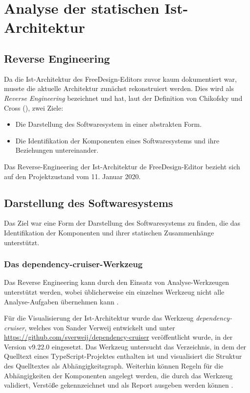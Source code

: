 

\section{Analyse der statischen Ist-Architektur}

\subsection{Reverse Engineering}
Da die Ist-Architektur des FreeDesign-Editors zuvor kaum dokumentiert war, musste die aktuelle Architektur zunächst rekonstruiert werden. 
Dies wird als \emph{Reverse Engineering} bezeichnet und hat, laut der Definition von Chikofsky und Cross (\citeyear[S. 13-17]{Chikofsky1990}), zwei Ziele: 
\begin{itemize}
    \item Die Darstellung des Softwaresystem in einer abstrakten Form. 
    \item Die Identifikation der Komponenten eines Softwaresystems und ihre Beziehungen untereinander. 
\end{itemize}
Das Reverse-Engineering der Ist-Architektur de FreeDesign-Editor bezieht sich auf den Projektzustand vom 11. Januar 2020. 

\subsection{Darstellung des Softwaresystems}
Das Ziel war eine Form der Darstellung des Softwaresystems zu finden, die das Identifikation der Komponenten und ihrer statischen Zusammenhänge unterstützt.

\subsubsection{Das {dependency-cruiser}-Werkzeug}
Das Reverse Engineering kann durch den Einsatz von Analyse-Werkzeugen unterstützt werden, wobei üblicherweise ein einzelnes Werkzeug nicht alle Analyse-Aufgaben übernehmen kann \autocite[vgl.][381]{Bass2013}.  

Für die Visualisierung der Ist-Architektur wurde das Werkzeug \emph{dependency-cruiser}, welches von Sander Verweij entwickelt und unter \url{https://github.com/sverweij/dependency-cruiser} veröffentlicht wurde, in der Version v9.22.0 eingesetzt. 
Das Werkzeug untersucht das Verzeichnis, in dem der Quelltext eines TypeScript-Projektes enthalten ist und visualisiert die Struktur des Quelltextes als Abhängigkeitsgraph. Weiterhin können Regeln für die Abhängigkeiten der Komponenten angelegt werden, die durch das Werkzeug validiert, Verstöße gekennzeichnet und als Report ausgeben werden können \autocite[vgl.][]{Verweij:Dependency}. 

